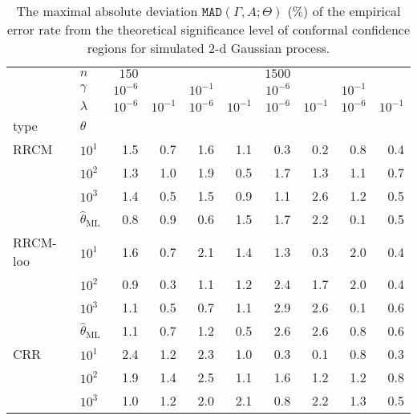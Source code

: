 \documentclass[a4paper,14pt]{extarticle}
\begin{document}
\begin{table}
  \centering
  \caption{The maximal absolute deviation $\mathtt{MAD}(\Gamma, A; \Theta)$ ($\%$)
  of the empirical error rate from the theoretical significance level of conformal
  confidence regions for simulated $2$-d Gaussian process.}
  \label{tab:gaussian_2d_cov_conf}
  \begin{tabular}{ll||rrrr|rrrr}
  \toprule
       & $n$ &    $150$  &          &          &          &     $1500$ &          &          &          \\\cline{2-2}
       & $\gamma$ & $10^{-6}$ &          & $10^{-1}$ &          & $10^{-6}$ &          & $10^{-1}$ &          \\\cline{2-2}
       & $\lambda$ & $10^{-6}$ & $10^{-1}$ & $10^{-6}$ & $10^{-1}$ & $10^{-6}$ & $10^{-1}$ & $10^{-6}$ & $10^{-1}$ \\\cline{2-2}
  type & $\theta$ &          &          &          &          &          &          &          &          \\
  \midrule
  RRCM & $10^1$ &      1.5 &      0.7 &      1.6 &      1.1 &      0.3 &      0.2 &      0.8 &      0.4 \\
       & $10^2$ &      1.3 &      1.0 &      1.9 &      0.5 &      1.7 &      1.3 &      1.1 &      0.7 \\
       & $10^3$ &      1.4 &      0.5 &      1.5 &      0.9 &      1.1 &      2.6 &      1.2 &      0.5 \\
       & $\hat{\theta}_\text{ML}$ &      0.8 &      0.9 &      0.6 &      1.5 &      1.7 &      2.2 &      0.1 &      0.5 \\
  \midrule
  RRCM-loo & $10^1$ &      1.6 &      0.7 &      2.1 &      1.4 &      1.3 &      0.3 &      2.0 &      0.4 \\
       & $10^2$ &      0.9 &      0.3 &      1.1 &      1.2 &      2.4 &      1.7 &      2.0 &      0.4 \\
       & $10^3$ &      1.1 &      0.5 &      0.7 &      1.1 &      2.9 &      2.6 &      0.1 &      0.6 \\
       & $\hat{\theta}_\text{ML}$ &      1.1 &      0.7 &      1.2 &      0.5 &      2.6 &      2.6 &      0.8 &      0.6 \\
  \midrule
  CRR & $10^1$ &      2.4 &      1.2 &      2.3 &      1.0 &      0.3 &      0.1 &      0.8 &      0.3 \\
       & $10^2$ &      1.9 &      1.4 &      2.5 &      1.1 &      1.6 &      1.2 &      1.2 &      0.8 \\
       & $10^3$ &      1.0 &      1.2 &      2.0 &      2.1 &      0.8 &      2.2 &      1.3 &      0.5 \\

\end{tabular}
\end{table}
\end{document}
